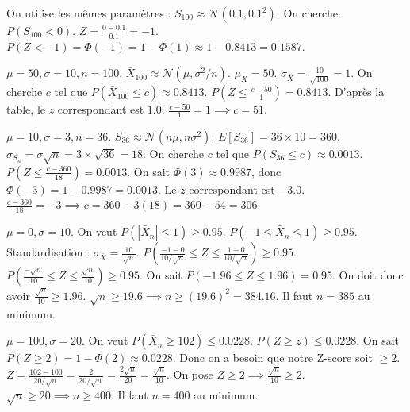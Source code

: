 \begin{correctionbox}
On utilise les mêmes paramètres : $S_{100} \approx \mathcal{N}(0.1, 0.1^2)$.
On cherche $P(S_{100} < 0)$.
$Z = \frac{0 - 0.1}{0.1} = -1$.
$P(Z < -1) = \Phi(-1) = 1 - \Phi(1) \approx 1 - 0.8413 = 0.1587$.
\end{correctionbox}

\begin{correctionbox}
$\mu=50, \sigma=10, n=100$. $\bar{X}_{100} \approx \mathcal{N}(\mu, \sigma^2/n)$.
$\mu_{\bar{X}} = 50$. $\sigma_{\bar{X}} = \frac{10}{\sqrt{100}} = 1$.
On cherche $c$ tel que $P(\bar{X}_{100} \le c) \approx 0.8413$.
$P(Z \le \frac{c - 50}{1}) = 0.8413$.
D'après la table, le $z$ correspondant est $1.0$.
$\frac{c - 50}{1} = 1 \implies c = 51$.
\end{correctionbox}

\begin{correctionbox}
$\mu=10, \sigma=3, n=36$. $S_{36} \approx \mathcal{N}(n\mu, n\sigma^2)$.
$E[S_{36}] = 36 \times 10 = 360$.
$\sigma_{S_n} = \sigma\sqrt{n} = 3 \times \sqrt{36} = 18$.
On cherche $c$ tel que $P(S_{36} \le c) \approx 0.0013$.
$P(Z \le \frac{c - 360}{18}) = 0.0013$.
On sait $\Phi(3) \approx 0.9987$, donc $\Phi(-3) = 1 - 0.9987 = 0.0013$.
Le $z$ correspondant est $-3.0$.
$\frac{c - 360}{18} = -3 \implies c = 360 - 3(18) = 360 - 54 = 306$.
\end{correctionbox}

\begin{correctionbox}
$\mu=0, \sigma=10$. On veut $P(|\bar{X}_n| \le 1) \ge 0.95$.
$P(-1 \le \bar{X}_n \le 1) \ge 0.95$.
Standardisation : $\sigma_{\bar{X}} = \frac{10}{\sqrt{n}}$.
$P\left( \frac{-1 - 0}{10/\sqrt{n}} \le Z \le \frac{1 - 0}{10/\sqrt{n}} \right) \ge 0.95$.
$P\left( \frac{-\sqrt{n}}{10} \le Z \le \frac{\sqrt{n}}{10} \right) \ge 0.95$.
On sait $P(-1.96 \le Z \le 1.96) = 0.95$.
On doit donc avoir $\frac{\sqrt{n}}{10} \ge 1.96$.
$\sqrt{n} \ge 19.6 \implies n \ge (19.6)^2 = 384.16$.
Il faut $n = 385$ au minimum.
\end{correctionbox}

\begin{correctionbox}
$\mu=100, \sigma=20$. On veut $P(\bar{X}_n \ge 102) \le 0.0228$.
$P(Z \ge z) \le 0.0228$. On sait $P(Z \ge 2) = 1 - \Phi(2) \approx 0.0228$.
Donc on a besoin que notre Z-score soit $\ge 2$.
$Z = \frac{102 - 100}{20 / \sqrt{n}} = \frac{2}{20 / \sqrt{n}} = \frac{2\sqrt{n}}{20} = \frac{\sqrt{n}}{10}$.
On pose $Z \ge 2 \implies \frac{\sqrt{n}}{10} \ge 2$.
$\sqrt{n} \ge 20 \implies n \ge 400$.
Il faut $n = 400$ au minimum.
\end{correctionbox}

